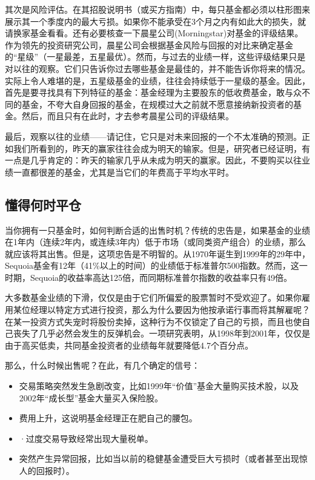 \documentclass[12pt,oneside]{book}
\begin{document}
其次是风险评估。在其招股说明书（或买方指南）中，每只基金都必须以柱形图来展示其一个季度内的最大亏损。如果你不能承受在3个月之内有如此大的损失，就请换家基金看看。还有必要核查一下晨星公司(Morningstar)对基金的评级结果。作为领先的投资研究公司，晨星公司会根据基金风险与回报的对比来确定基金的“星级”（一星最差，五星最优）。然而，与过去的业绩一样，这些评级结果只是对以往的观察。它们只告诉你过去哪些基金是最佳的，并不能告诉你将来的情况。实际上令人难堪的是，五星级基金的业绩，往往会持续低于一星级的基金。因此，首先是要寻找具有下列特征的基金：基金经理为主要股东的低收费基金，敢与众不同的基金，不夸大自身回报的基金，在规模过大之前就不愿意接纳新投资者的基金。然后，而且只有在此时，才去参考晨星公司的评级结果。

最后，观察以往的业绩——请记住，它只是对未来回报的一个不太准确的预测。正如我们所看到的，昨天的赢家往往会成为明天的输家。但是，研究者已经证明，有一点是几乎肯定的：昨天的输家几乎从未成为明天的赢家。因此，不要购买以往业绩一直都很差的基金，尤其是当它们的年费高于平均水平时。


\subsection{懂得何时平仓}
当你拥有一只基金时，如何判断合适的出售时机？传统的忠告是，如果基金的业绩在1年内（连续2年内，或连续3年内）低于市场（或同类资产组合）的业绩，那么就应该将其出售。但是，这项忠告是不明智的。从1970年诞生到1999年的29年中，Sequoia基金有12年（41\%以上的时间）的业绩低于标准普尔500指数。然而，这一时期，Sequoia的收益率高达125倍，而同期标准普尔指数的收益率只有49倍。

大多数基金业绩的下滑，仅仅是由于它们所偏爱的股票暂时不受欢迎了。如果你雇用某位经理以特定方式进行投资，那么为什么要因为他按承诺行事而将其解雇呢？在某一投资方式失宠时将股份卖掉，这种行为不仅锁定了自己的亏损，而且也使自己丧失了几乎必然会发生的反弹机会。一项研究表明，从1998年到2001年，仅仅是由于高买低卖，共同基金投资者的业绩每年就要降低4.7个百分点。

那么，什么时候出售呢？在此，有几个确定的信号：

\begin{itemize}
\item 交易策略突然发生急剧改变，比如1999年“价值”基金大量购买技术股，以及2002年“成长型”基金大量买入保险股。
\item 费用上升，这说明基金经理正在肥自己的腰包。
\item ·过度交易导致经常出现大量税单。
\item 突然产生异常回报，比如当以前的稳健基金遭受巨大亏损时（或者甚至出现惊人的回报时）。

\end{itemize}
\end{document}
